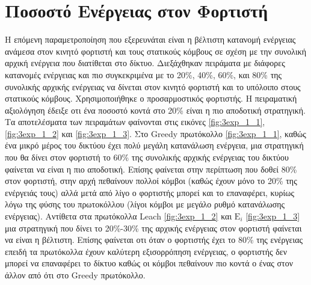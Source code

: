 \section{Ποσοστό Ενέργειας στον Φορτιστή}\label{sc:result3}
H επόμενη παραμετροποίηση που εξερευνάται είναι η βέλτιστη κατανομή ενέργειας ανάμεσα στον κινητό φορτιστή και τους στατικούς κόμβους σε σχέση με την συνολική αρχική
ενέργεια που διατίθεται στο δίκτυο. Διεξάχθηκαν πειράματα με διάφορες κατανομές ενέργειας και πιο συγκεκριμένα με το 20\%, 40\%, 60\%, και 80\% της συνολικής αρχικής
ενέργειας να δίνεται στον κινητό φορτιστή και το υπόλοιπο στους στατικούς κόμβους. Χρησιμοποιήθηκε ο προσαρμοστικός φορτιστής. Η πειραματική αξιολόγηση έδειξε οτι ένα
ποσοστό κοντά στο 20\% είναι η πιο αποδοτική στρατηγική. Τα αποτελέσματα των πειραμάτων φαίνονται στις εικόνες \ref{fig:3exp_1_1}, \ref{fig:3exp_1_2} και
\ref{fig:3exp_1_3}. Στο Greedy πρωτόκολλο \ref{fig:3exp_1_1}, καθώς ένα μικρό μέρος του δικτύου έχει πολύ μεγάλη κατανάλωση ενέργεια, μια στρατηγική που θα δίνει στον
φορτιστή το 60\% της συνολικής αρχικής ενέργειας του δικτύου φαίνεται να είναι η πιο αποδοτική. Επίσης φαίνεται στην περίπτωση που δοθεί 80\% στον φορτιστή, στην αρχή
πεθαίνουν πολλοί κόμβοι (καθώς έχουν μόνο το 20\% της ενέργειάς τους) αλλά μετά από λίγο ο φορτιστής μπορεί και το επαναφέρει, κυρίως λόγω της φύσης του πρωτοκόλλου
(λίγοι κόμβοι με μεγάλο ρυθμό κατανάλωσης ενέργειας). Αντίθετα στα πρωτόκολλα Leach \ref{fig:3exp_1_2} και $\text{E}_{i}$ \ref{fig:3exp_1_3} μια στρατηγική που δίνει
το 20\%-30\% της αρχικής ενέργειας στον φορτιστή φαίνεται να είναι η βέλτιστη. Επίσης φαίνεται οτι όταν ο φορτιστής έχει το 80\% της ενέργειας επειδή τα πρωτόκολλα
έχουν καλύτερη εξισορρόπηση ενέργειας, ο φορτιστής δεν μπορεί να επαναφέρει το δίκτυο καθώς οι κόμβοι πεθαίνουν πιο κοντά ο ένας στον άλλον από ότι στο Greedy
πρωτόκολλο.



